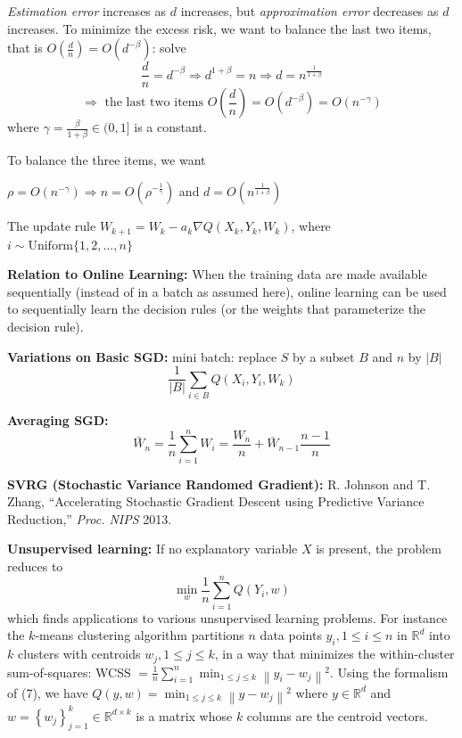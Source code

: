 \documentclass[11pt,a4paper]{article}
\begin{document}
\textit{Estimation error} increases as $d$ increases, but \textit{approximation error} decreases as $d$ increases. To minimize the excess risk, we want to balance the last two items, that is $O(\frac{d}{n})=O(d^{-\beta})$: solve $$\frac{d}{n}=d^{-\beta} \Rightarrow d^{1+\beta}=n \Rightarrow d=n^{\frac{1}{1+\beta}}$$
$$\Rightarrow\text{ the last two items } O(\frac{d}{n})=O(d^{-\beta})=O(n^{-\gamma})$$
where $\gamma=\frac{\beta}{1+\beta}\in(0,1]$ is a constant.

To balance the three items, we want
\begin{center}
    $\rho=O(n^{-\gamma})\Rightarrow n=O(\rho^{-\frac{1}{\gamma}})$ and $d=O(n^{\frac{1}{1+\beta}})$
\end{center}

The update rule $W_{k+1}=W_k-a_k \nabla Q(X_k,Y_k,W_k)$, where $i\sim \text{Uniform}\{1,2,...,n\}$

\textbf{Relation to Online Learning:} When the training data are made available sequentially (instead of in a batch as assumed here), online learning can be used to sequentially learn the decision rules (or the weights that parameterize the decision rule).

\textbf{Variations on Basic SGD:} mini batch: replace $S$ by a subset $B$ and $n$ by $|B|$
$$\frac{1}{|B|}\sum_{i\in B}Q(X_i,Y_i,W_k)$$

\textbf{Averaging SGD:} $$\bar{W}_n=\frac{1}{n}\sum_{i=1}^nW_i=\frac{W_n}{n}+\bar{W}_{n-1}\frac{n-1}{n}$$

\textbf{SVRG (Stochastic Variance Randomed Gradient):} R. Johnson and T. Zhang, “Accelerating Stochastic Gradient Descent using Predictive Variance Reduction,” \textit{Proc. NIPS} 2013.

\textbf{Unsupervised learning:} If no explanatory variable $X$ is present, the problem reduces to
$$
\min _w \frac{1}{n} \sum_{i=1}^n Q\left(Y_i, w\right)
$$
which finds applications to various unsupervised learning problems. For instance the $k$-means clustering algorithm partitions $n$ data points $y_i, 1 \leq i \leq n$ in $\mathbb{R}^d$ into $k$ clusters with centroids $w_j, 1 \leq j \leq k$, in a way that minimizes the within-cluster sum-of-squares: WCSS $=\frac{1}{n} \sum_{i=1}^n \min _{1 \leq j \leq k}\left\|y_i-w_j\right\|^2$. Using the formalism of (7), we have $Q(y, w)=\min _{1 \leq j \leq k}\left\|y-w_j\right\|^2$ where $y \in \mathbb{R}^d$ and $w=\left\{w_j\right\}_{j=1}^k \in \mathbb{R}^{d \times k}$ is a matrix whose $k$ columns are the centroid vectors.
\end{document}
